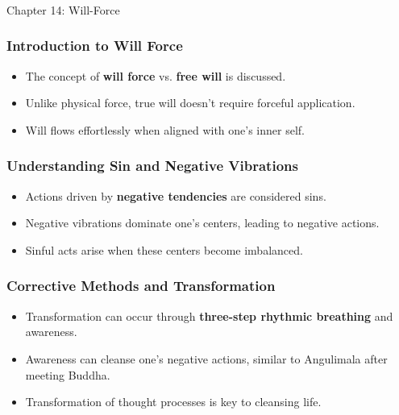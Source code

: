 \begin{frame}[fragile]\frametitle{}
\begin{center}
{\Large Chapter 14: Will-Force }
\end{center}
\end{frame}

\begin{frame}[fragile]\frametitle{Introduction to Will Force}
    \begin{itemize}
        \item The concept of \textbf{will force} vs. \textbf{free will} is discussed.
        \item Unlike physical force, true will doesn't require forceful application.
        \item Will flows effortlessly when aligned with one's inner self.
    \end{itemize}
\end{frame}

\begin{frame}[fragile]\frametitle{Understanding Sin and Negative Vibrations}
    \begin{itemize}
        \item Actions driven by \textbf{negative tendencies} are considered sins.
        \item Negative vibrations dominate one's centers, leading to negative actions.
        \item Sinful acts arise when these centers become imbalanced.
    \end{itemize}
\end{frame}

\begin{frame}[fragile]\frametitle{Corrective Methods and Transformation}
    \begin{itemize}
        \item Transformation can occur through \textbf{three-step rhythmic breathing} and awareness.
        \item Awareness can cleanse one's negative actions, similar to Angulimala after meeting Buddha.
        \item Transformation of thought processes is key to cleansing life.
    \end{itemize}
\end{frame}

